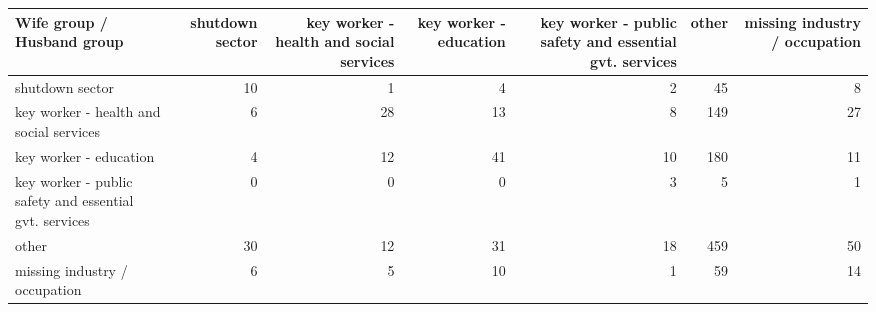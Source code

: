 
\begin{tabular}{lrrrrrr}
\toprule
Wife group / Husband group & shutdown sector & key worker - health
 and social services & key worker - education & key worker - public safety
 and essential gvt. services & other & missing industry / occupation\\
\midrule
shutdown sector & 10 & 1 & 4 & 2 & 45 & 8\\
key worker - health
 and social services & 6 & 28 & 13 & 8 & 149 & 27\\
key worker - education & 4 & 12 & 41 & 10 & 180 & 11\\
key worker - public safety
 and essential gvt. services & 0 & 0 & 0 & 3 & 5 & 1\\
other & 30 & 12 & 31 & 18 & 459 & 50\\
missing industry / occupation & 6 & 5 & 10 & 1 & 59 & 14\\
\bottomrule
\end{tabular}
